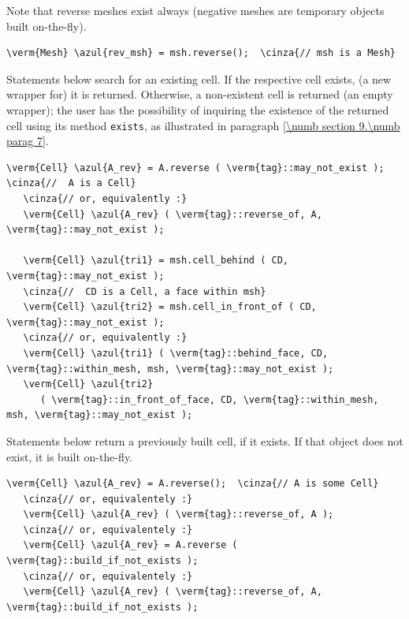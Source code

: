 Note that reverse meshes exist always (negative meshes are temporary objects built
on-the-fly).

\begin{Verbatim}[commandchars=\\\{\},formatcom=\small\tt,
   baselinestretch=0.94,framesep=2mm                      ]
   \verm{Mesh} \azul{rev_msh} = msh.reverse();  \cinza{// msh is a Mesh}
\end{Verbatim}

Statements below search for an existing cell.
If the respective cell exists, (a new wrapper for) it is returned.
Otherwise, a non-existent cell is returned
(an empty wrapper); the user has the possibility of inquiring the existence
of the returned cell using its method {\small\tt exists}, as illustrated in paragraph
\ref{\numb section 9.\numb parag 7}.

\begin{Verbatim}[commandchars=\\\{\},formatcom=\small\tt,
   baselinestretch=0.94,framesep=2mm                      ]
   \verm{Cell} \azul{A_rev} = A.reverse ( \verm{tag}::may_not_exist );  \cinza{//  A is a Cell}
   \cinza{// or, equivalently :}
   \verm{Cell} \azul{A_rev} ( \verm{tag}::reverse_of, A, \verm{tag}::may_not_exist );
   
   \verm{Cell} \azul{tri1} = msh.cell_behind ( CD, \verm{tag}::may_not_exist );
   \cinza{//  CD is a Cell, a face within msh}
   \verm{Cell} \azul{tri2} = msh.cell_in_front_of ( CD, \verm{tag}::may_not_exist );
   \cinza{// or, equivalently :}
   \verm{Cell} \azul{tri1} ( \verm{tag}::behind_face, CD, \verm{tag}::within_mesh, msh, \verm{tag}::may_not_exist );
   \verm{Cell} \azul{tri2}
      ( \verm{tag}::in_front_of_face, CD, \verm{tag}::within_mesh, msh, \verm{tag}::may_not_exist );
\end{Verbatim}

Statements below return a previously built cell, if it exists.
If that object does not exist, it is built on-the-fly.

\begin{Verbatim}[commandchars=\\\{\},formatcom=\small\tt,
   baselinestretch=0.94,framesep=2mm                      ]
   \verm{Cell} \azul{A_rev} = A.reverse();  \cinza{// A is some Cell}
   \cinza{// or, equivalentely :}
   \verm{Cell} \azul{A_rev} ( \verm{tag}::reverse_of, A );
   \cinza{// or, equivalentely :}
   \verm{Cell} \azul{A_rev} = A.reverse ( \verm{tag}::build_if_not_exists );
   \cinza{// or, equivalentely :}
   \verm{Cell} \azul{A_rev} ( \verm{tag}::reverse_of, A, \verm{tag}::build_if_not_exists );
\end{Verbatim}

